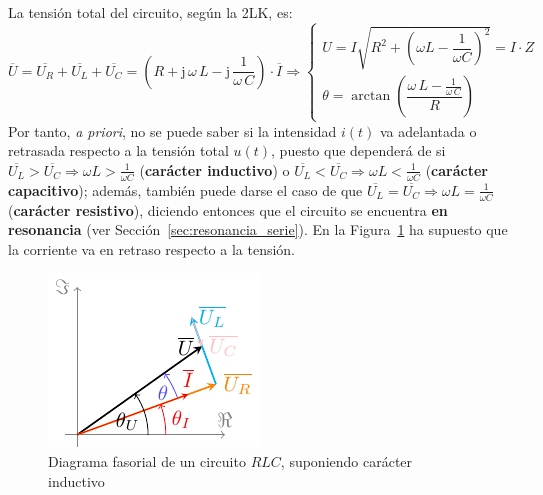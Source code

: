 La tensión total del circuito, según la 2LK, es:
\begin{equation*}
  \overline{U} = \overline{U_R} +\overline{U_L} + \overline{U_C} =\left(R+\mathrm{j}\,\omega\,L - \mathrm{j}\,\dfrac{1}{\omega\,C}\right) \cdot \overline{I}\Rightarrow 
  \begin{cases}
    U=I\sqrt{R^2 + \left(\omega L - \dfrac{1}{\omega C}\right)^2}=I\cdot Z\\
    \theta=\arctan\left( \dfrac{\omega\,L-\frac{1}{\omega\,C}}{R}\right)
  \end{cases}
\end{equation*}
Por tanto, \textit{a priori}, no se puede saber si la intensidad
$i(t)$ va {adelantada o retrasada} respecto a la tensión total $u(t)$,
puesto que dependerá de si
$\overline{U_L}>\overline{U_C}\Rightarrow \omega L>\frac{1}{\omega C}$
(\textbf{carácter inductivo}) o
$\overline{U_L}<\overline{U_C}\Rightarrow \omega L<\frac{1}{\omega C}$
(\textbf{carácter capacitivo}); además, también puede darse el caso de
que
$\overline{U_L}=\overline{U_C}\Rightarrow \omega L=\frac{1}{\omega C}$
(\textbf{carácter resistivo}), diciendo entonces que el circuito se
encuentra \textbf{en resonancia} (ver
Sección~\ref{sec:resonancia_serie}). En la
Figura~\ref{fig:fasorRLC_VI} ha supuesto que la corriente va en
retraso respecto a la tensión.
\begin{figure}[H]
  \centering
  \includegraphics[width=0.3\linewidth]{../figs/fasorRLC_VI.pdf}
  \caption{Diagrama fasorial de un circuito $RLC$, suponiendo carácter
    inductivo}
  \label{fig:fasorRLC_VI}
\end{figure}
	
	
	

